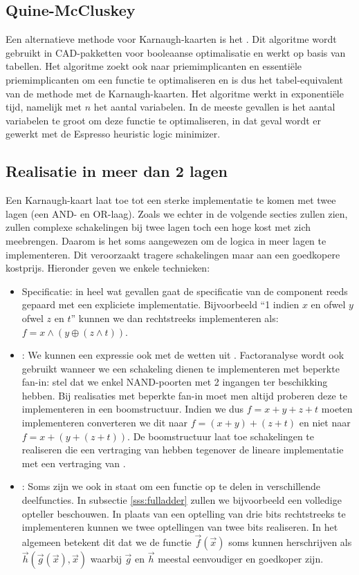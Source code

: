 \subsection{Quine-McCluskey}
Een alternatieve methode voor Karnaugh-kaarten is het . Dit algoritme wordt gebruikt in CAD-pakketten voor booleaanse optimalisatie en werkt op basis van tabellen. Het algoritme zoekt ook naar priemimplicanten en essenti\"ele priemimplicanten om een functie te optimaliseren en is dus het tabel-equivalent van de methode met de Karnaugh-kaarten. Het algoritme werkt in exponenti\"ele tijd, namelijk  met $n$ het aantal variabelen. In de meeste gevallen is het aantal variabelen te groot om deze functie te optimaliseren, in dat geval wordt er gewerkt met de Espresso heuristic logic minimizer.
\subsection{Realisatie in meer dan 2 lagen}
Een Karnaugh-kaart laat toe tot een sterke implementatie te komen met twee lagen (een AND- en OR-laag). Zoals we echter in de volgende secties zullen zien, zullen complexe schakelingen bij twee lagen toch een hoge kost met zich meebrengen. Daarom is het soms aangewezen om de logica in meer lagen te implementeren. Dit veroorzaakt tragere schakelingen maar aan een goedkopere kostprijs. Hieronder geven we enkele technieken:
\begin{itemize}
 \item Specificatie: in heel wat gevallen gaat de specificatie van de component reeds gepaard met een expliciete implementatie. Bijvoorbeeld ``1 indien $x$ en ofwel $y$ ofwel $z$ en $t$'' kunnen we dan rechtstreeks implementeren als: $f=x\wedge\left(y\oplus\left(z\wedge t\right)\right)$.
 \item {}: We kunnen een expressie ook  met de wetten uit . Factoranalyse wordt ook gebruikt wanneer we een schakeling dienen te implementeren met beperkte fan-in: stel dat we enkel NAND-poorten met 2 ingangen ter beschikking hebben. Bij realisaties met beperkte fan-in moet men altijd proberen deze te implementeren in een boomstructuur. Indien we dus $f=x+y+z+t$ moeten implementeren converteren we dit naar $f=\left(x+y\right)+\left(z+t\right)$ en niet naar $f=x+\left(y+\left(z+t\right)\right)$. De boomstructuur laat toe schakelingen te realiseren die een vertraging van  hebben tegenover de lineare implementatie met een vertraging van .
 \item {}: Soms zijn we ook in staat om een functie op te delen in verschillende deelfuncties. In subsectie \ref{sss:fulladder} zullen we bijvoorbeeld een volledige opteller beschouwen. In plaats van een optelling van drie bits rechtstreeks te implementeren kunnen we twee optellingen van twee bits realiseren. In het algemeen betekent dit dat we de functie $\vec{f}\left(\vec{x}\right)$ soms kunnen herschrijven als $\vec{h}\left(\vec{g}\left(\vec{x}\right),\vec{x}\right)$ waarbij $\vec{g}$ en $\vec{h}$ meestal eenvoudiger en goedkoper zijn.
\end{itemize}
